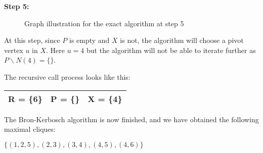 \begin{minipage}{\linewidth}
    \textbf{Step 5:} \newline
    \begin{minipage}{0.4\textwidth}
        \begin{figure}[H]
            \centering
            \caption{Graph illustration for the exact algorithm at step 5}
            \label{fig:exact-mewc-step5}
        \end{figure}
    \end{minipage}
    \begin{minipage}{0.6\textwidth}
        At this step, since $P$ is empty and $X$ is not, the algorithm will
        choose a pivot vertex $u$ in $X$. Here $u = 4$ but the algorithm will
        not be able to iterate further as $P\backslash N(4) = \{\}$. \newline

        The recursive call process looks like this:
        \begin{center}
            \begin{tabular}{|lll|}
                \hline
                R = \{6\} & P = \{\} & X = \{4\} \\
                \hline
            \end{tabular}
        \end{center}
    \end{minipage}
\end{minipage} \newline

The Bron-Kerbosch algorithm is now finished, and we have obtained the following
maximal cliques:
\begin{center}
    $\{(1,2,5),(2,3),(3,4),(4,5),(4,6)\}$
\end{center}

